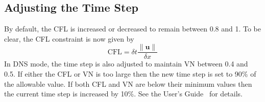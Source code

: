 \subsection{Adjusting the Time Step}

By default, the CFL is increased or decreased to remain between 0.8 and 1.  To be clear, the CFL constraint is now given by
\begin{equation}
\mbox{CFL} = \delta t \frac{\|\mathbf{u}\|}{\delta x}
\end{equation}
In DNS mode, the time step is also adjusted to maintain VN between 0.4 and 0.5. If either the CFL or VN is too large then the new time step is set to 90\% of the allowable value.  If both CFL and VN are below their minimum values then the current time step is increased by 10\%.  See the User's Guide~\cite{FDS_Users_Guide} for details.




